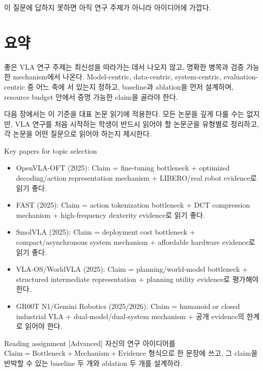 이 질문에 답하지 못하면 아직 연구 주제가 아니라 아이디어에 가깝다.

\section{요약}

좋은 VLA 연구 주제는 최신성을 따라가는 데서 나오지 않고, 명확한 병목과 검증 가능한 mechanism에서 나온다. Model-centric, data-centric, system-centric, evaluation-centric 중 어느 축에 서 있는지 정하고, baseline과 ablation을 먼저 설계하며, resource budget 안에서 증명 가능한 claim을 골라야 한다.

다음 장에서는 이 기준을 대표 논문 읽기에 적용한다. 모든 논문을 깊게 다룰 수는 없지만, VLA 연구를 처음 시작하는 학생이 반드시 읽어야 할 논문군을 유형별로 정리하고, 각 논문을 어떤 질문으로 읽어야 하는지 제시한다.

\begin{sourcebox}{Key papers for topic selection}
\begin{itemize}
  \item OpenVLA-OFT (2025): Claim = fine-tuning bottleneck + optimized decoding/action representation mechanism + LIBERO/real robot evidence로 읽기 좋다.
  \item FAST (2025): Claim = action tokenization bottleneck + DCT compression mechanism + high-frequency dexterity evidence로 읽기 좋다.
  \item SmolVLA (2025): Claim = deployment cost bottleneck + compact/asynchronous system mechanism + affordable hardware evidence로 읽기 좋다.
  \item VLA-OS/WorldVLA (2025): Claim = planning/world-model bottleneck + structured intermediate representation + planning utility evidence로 평가해야 한다.
  \item GR00T N1/Gemini Robotics (2025/2026): Claim = humanoid or closed industrial VLA + dual-model/dual-system mechanism + 공개 evidence의 한계로 읽어야 한다.
\end{itemize}
\end{sourcebox}

\begin{assignmentbox}{Reading assignment [Advanced]}
자신의 연구 아이디어를 \(\mathrm{Claim}=\mathrm{Bottleneck}+\mathrm{Mechanism}+\mathrm{Evidence}\) 형식으로 한 문장에 쓰고, 그 claim을 반박할 수 있는 baseline 두 개와 ablation 두 개를 설계하라.
\end{assignmentbox}

